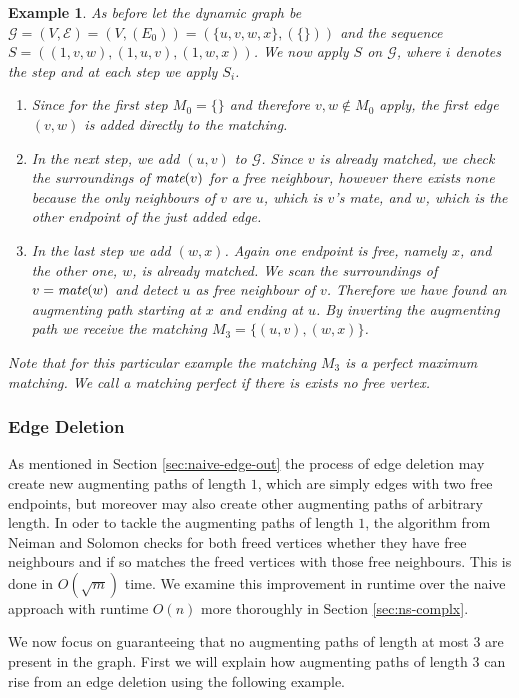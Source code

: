 \documentclass{article}      %
\newtheorem{example}{Example}[subsection]
\DeclareMathOperator\mate{\emph{mate}}
\begin{document}
\begin{example}
\label{ex:ns-aug-path}
As before let the dynamic graph be $\mathcal{G}=(V,\mathcal{E})=(V,(E_0))=(\{u,v,w,x\},(\{\}))$ and the sequence $S=((1,v,w),(1,u,v),(1,w,x))$. We now apply $S$ on $\mathcal{G}$, where $i$ denotes the step and at each step we apply $S_i$.
\begin{enumerate}
	\item[i=0:] Since for the first step $M_0 = \{\}$ and therefore $v,w \notin M_0$ apply, the first edge $(v,w)$ is added directly to the matching. 	\item[i=1:] In the next step, we add $(u,v)$ to $\mathcal{G}$. Since $v$ is already matched, we check the surroundings of $\mate(v)$ for a free neighbour, however there exists none because the only neighbours of $v$ are $u$, which is $v$'s mate, and $w$, which is the other endpoint of the just added edge. 
	\item[i=2:] In the last step we add $(w,x)$. Again one endpoint is free, namely $x$, and the other one, $w$, is already matched. We scan the surroundings of $v=\mate(w)$ and detect $u$ as free neighbour of $v$. Therefore we have found an augmenting path starting at $x$ and ending at $u$. By inverting the augmenting path we receive the matching $M_3=\{(u,v),(w,x)\}$.
\end{enumerate}
Note that for this particular example the matching $M_3$ is a \emph{perfect} maximum matching. We call a matching \emph{perfect} if there is exists no free vertex.
\end{example}

\subsubsection{Edge Deletion}
\label{sec:ns-edge-out}

As mentioned in Section \ref{sec:naive-edge-out} the process of edge deletion may create new augmenting paths of length $1$, which are simply edges with two free endpoints, but moreover may also create other augmenting paths of arbitrary length. In oder to tackle the augmenting paths of length $1$, the algorithm from Neiman and Solomon checks for both freed vertices whether they have free neighbours and if so matches the freed vertices with those free neighbours. This is done in $O(\sqrt{m})$ time. We examine this improvement in runtime over the naive approach with runtime $O(n)$ more thoroughly in Section \ref{sec:ns-complx}. 

We now focus on guaranteeing that no augmenting paths of length at most $3$ are present in the graph. First we will explain how augmenting paths of length $3$ can rise from an edge deletion using the following example.
\end{document}
